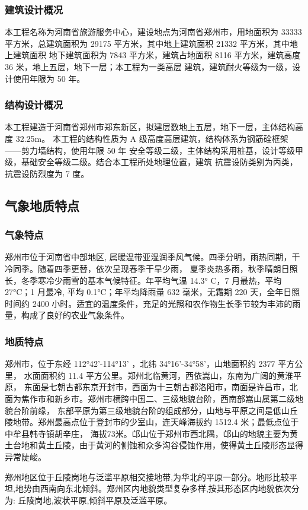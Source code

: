 \subsubsection{建筑设计概况}

本工程名称为河南省旅游服务中心，建设地点为河南省郑州市，用地面积为 33333 平方米，总建筑面积为 29175 平方米，其中地上建筑面积 21332 平方米，其中地上建筑面积
地下建筑面积为 7843 平方米，建筑占地面积 8116 平方米，建筑高度 36 米，地上五层，地下一层；本工程为一类高层
建筑，建筑耐火等级为一级，设计使用年限为 50 年。

\subsubsection{结构设计概况}

本工程建造于河南省郑州市郑东新区，拟建层数地上五层，地下一层，主体结构高度 32.25m。
本工程的结构性质为 A 级高度高层建筑，结构体系为钢筋硂框架——剪力墙结构，使用年限 50 年
安全等级二级，主体结构采用桩基，设计等级甲级，基础安全等级二级。结合本工程所处地理位置，建筑
抗震设防类别为丙类，抗震设防烈度为 7 度。

\subsection{气象地质特点}
\subsubsection{气象特点}

郑州市位于河南省中部地区, 属暖温带亚湿润季风气候。四季分明，雨热同期，干冷同季。随着四季更替，依次呈现春季干旱少雨，
夏季炎热多雨，秋季晴朗日照长，冬季寒冷少雨雪的基本气候特征。年平均气温 14.3° C，7 月最热，平均 27°C；1 月最冷,
平均 0.1°C；年平均降雨量 632 毫米，无霜期 220 天，全年日照时间约 2400 小时。适宜的温度条件，充足的光照和农作物生长季节较为丰沛的雨量，构成了良好的农业气象条件。

\subsubsection{地质特点}

郑州市，位于东经 112°42'-114°13' ，北纬 34°16'-34°58'，山地面积约 2377 平方公里， 水面面积约 11.4 平方公里。郑州北临黄河，西依嵩山，东南为广阔的黄淮平原，
东面是七朝古都东京开封市，西面为十三朝古都洛阳市，南面是许昌市，北面为焦作市和新乡市。郑州市横跨中国二、三级地貌台阶，西南部嵩山属第二级地貌台阶前缘，
东部平原为第三级地貌台阶的组成部分，山地与平原之间是低山丘陵地带。郑州最高点位于登封市的少室山，连天峰海拔约 1512.4 米；最低点位于中牟县韩寺镇胡辛庄，
海拔73米。邙山位于郑州市西北隅，邙山的地貌主要为黄土台地和黄土丘陵，由于黄河的侧蚀和众多沟谷侵蚀作用，使得黄土丘陵形态显得异常陡峻。

郑州地区位于丘陵岗地与泛滥平原相交接地带,为华北的平原一部分。地形比较平坦,地势由西南向东北倾斜。郑州区内地貌类型复杂多样,按其形态区内地貌依次分为:
丘陵岗地,波状平原,倾斜平原及泛滥平原。